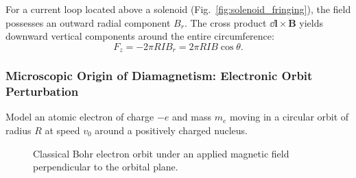 For a current loop located above a solenoid (Fig.~\ref{fig:solenoid_fringing}), the field possesses an outward radial component $B_r$. The cross product $\dd{\bm{l}}\times \bm{B}$ yields downward vertical components around the entire circumference:
\begin{equation}
    F_z = -2\pi R I B_r = 2\pi R I B \cos\theta.
\end{equation}

\subsubsection{Microscopic Origin of Diamagnetism: Electronic Orbit Perturbation}

Model an atomic electron of charge $-e$ and mass $m_e$ moving in a circular orbit of radius $R$ at speed $v_0$ around a positively charged nucleus.

\begin{figure}[htbp]
    \centering
    \caption{Classical Bohr electron orbit under an applied magnetic field perpendicular to the orbital plane.}
    \label{fig:atomic_orbit}
\end{figure}


